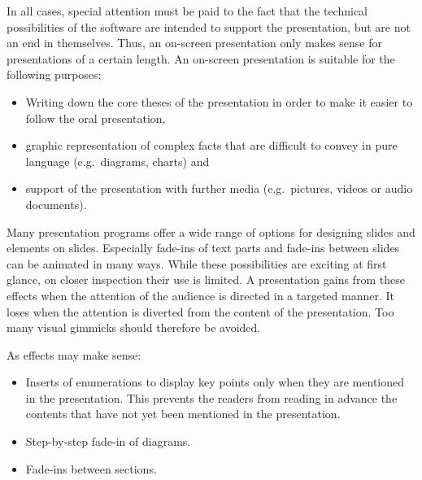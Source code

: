 \documentclass[
  english,
]{scrreprt}
\begin{document}
In all cases, special attention must be paid to the fact that the technical possibilities of the software are intended to support the presentation, but are not an end in themselves. Thus, an on-screen presentation only makes sense for presentations of a certain length. An on-screen presentation is suitable for the following purposes:

\begin{itemize}
\item
  Writing down the core theses of the presentation in order to make it easier to follow the oral presentation,
\item
  graphic representation of complex facts that are difficult to convey in pure language (e.g.~diagrams, charts) and
\item
  support of the presentation with further media (e.g.~pictures, videos or audio documents).
\end{itemize}

Many presentation programs offer a wide range of options for designing slides and elements on slides. Especially fade-ins of text parts and fade-ins between slides can be animated in many ways. While these possibilities are exciting at first glance, on closer inspection their use is limited. A presentation gains from these effects when the attention of the audience is directed in a targeted manner. It loses when the attention is diverted from the content of the presentation. Too many visual gimmicks should therefore be avoided.

As effects may make sense:

\begin{itemize}
\item
  Inserts of enumerations to display key points only when they are mentioned in the presentation. This prevents the readers from reading in advance the contents that have not yet been mentioned in the presentation.
\item
  Step-by-step fade-in of diagrams.
\item
  Fade-ins between sections.
\end{itemize}
\end{document}
